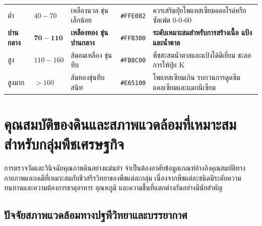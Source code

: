 \begin{table}[H]
\begin{tabularx}{\textwidth}{p{2.2cm}p{2.2cm}p{2.8cm}p{1.8cm}Y}
    ต่ำ & $40 - 70$ & เหลืองนวล ขุ่นเล็กน้อย & \texttt{\#FFE082} & ควรเสริมปุ๋ยโพแทสเซียมคลอไรด์หรือซัลเฟต 0-0-60 \\
    \textbf{ปานกลาง} & $\mathbf{70 - 110}$ & \textbf{เหลืองทอง ขุ่นปานกลาง} & \texttt{\#FFB300} & \textbf{ระดับเหมาะสมสำหรับการสร้างเนื้อ แป้ง และน้ำตาล} \\
    สูง & $110 - 160$ & ส้มอมเหลือง ขุ่นทึบ & \texttt{\#FB8C00} & พืชสะสมน้ำตาลและแป้งได้ดีเยี่ยม ชะลอการให้ปุ๋ย K \\
    สูงมาก & $> 160$ & ส้มทองขุ่นทึบสนิท & \texttt{\#E65100} & โพแทสเซียมเกิน รบกวนการดูดซึมแคลเซียมและแมกนีเซียม \\
    \bottomrule
\end{tabularx}
\end{table}

\section{คุณสมบัติของดินและสภาพแวดล้อมที่เหมาะสมสำหรับกลุ่มพืชเศรษฐกิจ}

การตรวจวัดและวินิจฉัยคุณภาพดินอย่างแม่นยำ จำเป็นต้องอาศัยข้อมูลเกณฑ์อ้างอิงคุณสมบัติทางกายภาพและเคมีที่เหมาะสมกับชีวสรีรวิทยาของพืชแต่ละกลุ่ม เนื่องจากพืชแต่ละชนิดมีระดับความทนทานและความต้องการธาตุอาหาร อุณหภูมิ และความชื้นที่แตกต่างกันอย่างมีนัยสำคัญ

\subsection{ปัจจัยสภาพแวดล้อมทางปฐพีวิทยาและบรรยากาศ}

